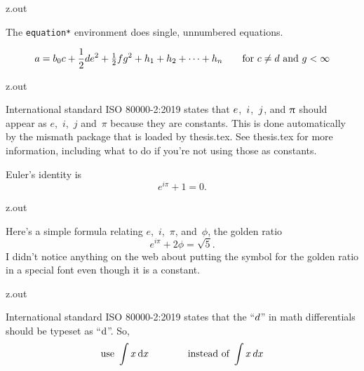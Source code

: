 \MyIOT


\begin{VerbatimOut}{z.out}

The \verb+equation*+ environment does single, unnumbered equations.

\begin{equation*}
  a = b_0c + \frac12 de^2 + {\textstyle \frac12} fg^2
    + h_1 + h_2 + \cdots + h_n
    \qquad \text{for \(c \ne d\) and \( g < \infty\)}
\end{equation*}
\end{VerbatimOut}

\MyIOT


\begin{VerbatimOut}{z.out}

International standard ISO 80000-2:2019 \cite{iso8000022019}
states that $\mit e$,~$\mit i$,~$\mit j$,
and $\itpi$ should appear as
$e$,~$i$,~$j$
and~$\pi$ because they are constants.
This is done automatically by the mismath package
that is loaded by thesis.tex.
See thesis.tex for more information,
including what to do if you're not using those as constants.

Euler's identity is
\begin{equation*}
  e^{i\pi} + 1 = 0.
\end{equation*}
\end{VerbatimOut}

\MyIOT


\begin{VerbatimOut}{z.out}

Here's a simple formula relating $e$,~$i$,~$\pi$, and~$\phi$,
the golden ratio
\begin{equation}
  e^{i\pi} + 2\phi = \sqrt 5.
\end{equation}
I didn't notice anything on the web about putting the symbol for
the golden ratio in a special font even though it is a constant.
\end{VerbatimOut}

\MyIOT


\begin{VerbatimOut}{z.out}
  
International standard ISO 80000-2:2019 \cite{iso8000022019}
states that the ``$d\/$'' in math differentials
should be typeset as ``$\di$''.
So,
\begin{equation*}
  \text{use } \int x\di x\qquad\qquad \text{instead of } \int x\,dx
\end{equation*}
\end{VerbatimOut}


